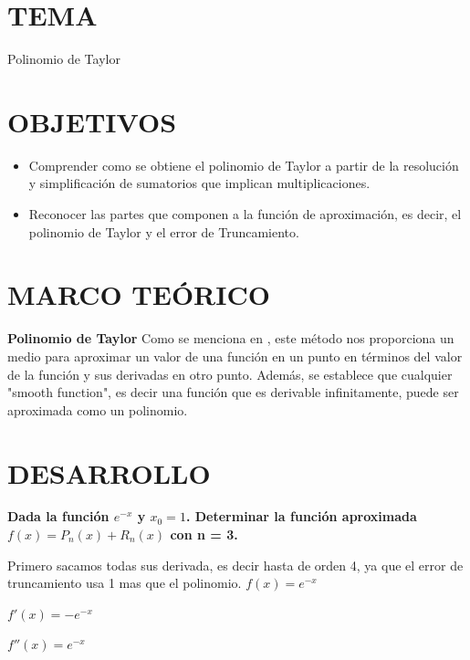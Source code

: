 \documentclass[12pt]{article}
\begin{document}
\section*{TEMA}
Polinomio de Taylor

\vspace{0.5cm}

\section*{OBJETIVOS}
\begin{itemize}
    \item Comprender como se obtiene el polinomio de Taylor a partir de la resolución y simplificación de sumatorios que implican multiplicaciones.
    \item Reconocer las partes que componen a la función de aproximación, es decir, el polinomio de Taylor y el error de Truncamiento.

\end{itemize}

\vspace{0.5cm}

\section*{MARCO TEÓRICO}

\textbf{Polinomio de Taylor}
\normalsize\newline\newline
Como se menciona en \cite{book:2450406}, este método nos proporciona un medio para aproximar 
un valor de una función en un punto en términos del  valor de la función y sus derivadas en otro punto.
Además, se establece que cualquier "smooth function", es decir una función que es derivable infinitamente, puede ser aproximada como un polinomio. 
\vspace{0.5cm}

\section*{DESARROLLO}

\textbf{Dada la función $e^{-x}$  y $x_0 = 1$. Determinar la función aproximada $f(x)=P_n (x)+R_n(x)$ con n = 3.}

Primero sacamos todas sus derivada, es decir hasta de orden 4, ya que el error de truncamiento usa 1 mas que el polinomio.
$f(x) = e^{-x}$

$f'(x) = -e^{-x}$

$f''(x) = e^{-x}$
\end{document}

